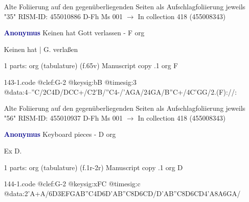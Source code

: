 \documentclass[twocolumn]{book}
\begin{document}
\newline Alte Foliierung auf den gegenüberliegenden Seiten als Aufschlagfoliierung jeweils "35"
\newline RISM-ID: 455010886
\newline D-Fh  Ms 001
\newline $\rightarrow$ In collection 418 (455008343)
      
\newline \par \vspace{7pt} \textcolor{darkblue}{\textbf{Anonymus  }}
\newline Keinen hat Gott verlassen - F
\newline org
\newline \begin{itshape}[f.65v, at left:] Keinen hat | G. verlaßen\end{itshape} 
\newline \textcolor{darkblue}{}  1 parts: org (tabulature)  (f.65v)
\newline Manuscript copy
.1  org  F  
\begin{filecontents*}{143-1.code}
@clef:G-2
@keysig:bB
@timesig:3
@data:4--''C/2C4D/DCC+/C2'B/''C4-/'AGA/24GA/B''C+/4C'GG/2.(F)://:
\end{filecontents*}
\newline
%

\newline Alte Foliierung auf den gegenüberliegenden Seiten als Aufschlagfoliierung jeweils "56"
\newline RISM-ID: 455010937
\newline D-Fh  Ms 001
\newline $\rightarrow$ In collection 418 (455008343)
      
\newline \par \vspace{7pt} \textcolor{darkblue}{\textbf{Anonymus  }}
\newline Keyboard pieces - D
\newline org
\newline \begin{itshape}[f.1r, at left:] Ex D.\end{itshape} 
\newline \textcolor{darkblue}{}  1 parts: org (tabulature)  (f.1r-2r)
\newline Manuscript copy
.1  org  D  
\begin{filecontents*}{144-1.code}
@clef:G-2
@keysig:xFC
@timesig:c
@data:2'A+A/{6D3EF}{GAB''C}4D{6D'AB''C}{8D6CD}/{D'AB''C}{8D6CD}4'A{8A6GA}/
\end{filecontents*}
\newline
%
\end{document}
